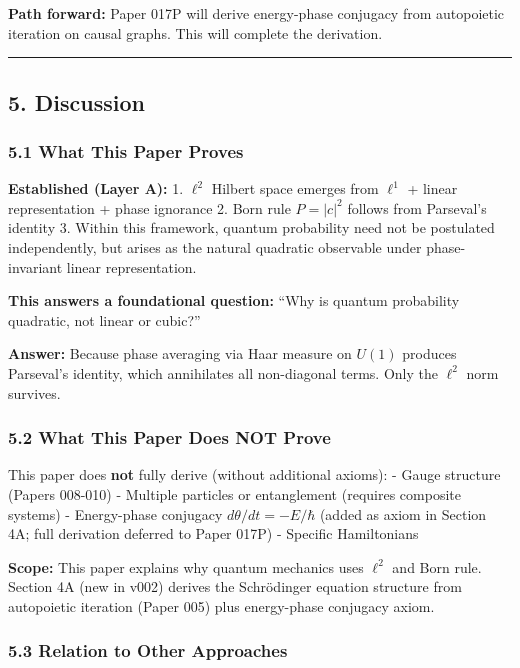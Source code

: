\documentclass[
]{article}
\begin{document}
\textbf{Path forward:} Paper 017P will derive energy-phase conjugacy
from autopoietic iteration on causal graphs. This will complete the
derivation.

\begin{center}\rule{0.5\linewidth}{0.5pt}\end{center}

\subsection{5. Discussion}\label{discussion}

\subsubsection{5.1 What This Paper Proves}\label{what-this-paper-proves}

\textbf{Established (Layer A):} 1. \(\ell^2\) Hilbert space emerges from
\(\ell^1\) + linear representation + phase ignorance 2. Born rule
\(P = |c|^2\) follows from Parseval's identity 3. Within this framework,
quantum probability need not be postulated independently, but arises as
the natural quadratic observable under phase-invariant linear
representation.

\textbf{This answers a foundational question:} ``Why is quantum
probability quadratic, not linear or cubic?''

\textbf{Answer:} Because phase averaging via Haar measure on \(U(1)\)
produces Parseval's identity, which annihilates all non-diagonal terms.
Only the \(\ell^2\) norm survives.

\subsubsection{5.2 What This Paper Does NOT
Prove}\label{what-this-paper-does-not-prove}

This paper does \textbf{not} fully derive (without additional axioms): -
Gauge structure (Papers 008-010) - Multiple particles or entanglement
(requires composite systems) - Energy-phase conjugacy
\(d\theta/dt = -E/\hbar\) (added as axiom in Section 4A; full derivation
deferred to Paper 017P) - Specific Hamiltonians

\textbf{Scope:} This paper explains why quantum mechanics uses
\(\ell^2\) and Born rule. Section 4A (new in v002) derives the
Schrödinger equation structure from autopoietic iteration (Paper 005)
plus energy-phase conjugacy axiom.

\subsubsection{5.3 Relation to Other
Approaches}\label{relation-to-other-approaches}
\end{document}
